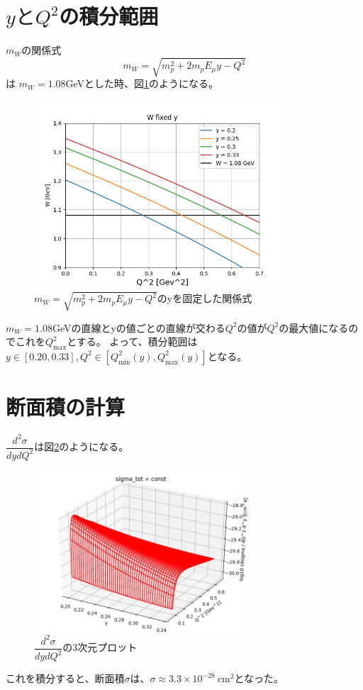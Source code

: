 \section{\texorpdfstring{$yとQ^2$}{LG}の積分範囲}
$m_W$の関係式
\begin{equation}
    m_W = \sqrt{m_p^2 + 2m_pE_\mu y - Q^2}
\end{equation}
は
$m_W = 1.08$GeVとした時、図\ref{fig:sigma5}のようになる。
\begin{figure}[H]
    \centering
    \includegraphics[height=7cm]{img/W2_fixed_y.png}
    \caption{$m_W = \sqrt{m_p^2 + 2m_pE_\mu y - Q^2}$のyを固定した関係式}
    \label{fig:sigma5}
\end{figure}
$m_W = 1.08$GeVの直線とyの値ごとの直線が交わる$Q^2$の値が$Q^2$の最大値になるのでこれを$Q^2_{\mathrm{max}}$とする。
よって、積分範囲は$y \in [0.20, 0.33], Q^2 \in [Q^2_{\mathrm{min}}(y), Q^2_{\mathrm{max}}(y)]$となる。

\section{断面積の計算}
$\dfrac{d^2\sigma}{dydQ^2}$は図\ref{fig:sigma6}のようになる。
\begin{figure}[H]
    \centering
    \includegraphics[width=8cm]{img/integrate_flux_used_artile.png}
    \caption{$\dfrac{d^2\sigma}{dydQ^2}$の3次元プロット}
    \label{fig:sigma6}
\end{figure}
これを積分すると、断面積$\sigma$は、$\sigma \approx 3.3 \times 10^{-28} \ \mathrm{cm^2}$となった。

